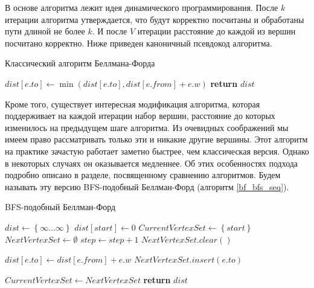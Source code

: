 В основе алгоритма лежит идея динамического программирования. После $k$ итерации алгоритма утверждается, что будут корректно посчитаны и обработаны пути длиной не более $k$. И после $V$ итерации расстояние до каждой из вершин посчитано корректно. Ниже приведен каноничный псевдокод алгоритма. 

\FloatBarrier
\begin{algorithm}
\caption{Классический алгоритм Беллмана-Форда}\label{bf_classic_seq}
\begin{algorithmic}[1]
 
		\State $dist[e.to] \gets \min(dist[e.to], dist[e.from] + e.w)$
	\EndFor
\EndFor
\State \textbf{return} $dist$
\EndProcedure
\end{algorithmic}
\end{algorithm}

\FloatBarrier
Кроме того, существует интересная модификация алгоритма, которая поддерживает на каждой итерации набор вершин, расстояние до которых изменилось на предыдущем шаге алгоритма. Из очевидных соображений мы имеем право рассматривать только эти и никакие другие вершины. Этот алгоритм на практике зачастую работает заметно быстрее, чем классическая версия. Однако в некоторых случаях он оказывается медленнее. Об этих особенностях подхода подробно описано в разделе, посвященному сравнению алгоритмов. Будем называть эту версию BFS-подобный Беллман-Форд (алгоритм \ref{bf_bfs_seq}). 

\FloatBarrier
\begin{algorithm}
\caption{BFS-подобный Беллман-Форд}\label{bf_bfs_seq}
\begin{algorithmic}[1]
\State $dist\gets \left\{ {\infty ... \infty}\right\}$
\State $dist[start] \gets 0$
\State $CurrentVertexSet \gets \left\{ {start}\right\}$ 
\State $NextVertexSet \gets \emptyset$ 
	\State $step \gets step + 1$
	\State $NextVertexSet.clear()$
	
		  
				\State $dist[e.to] \gets dist[e.from] + e.w$
				\State $NextVertexSet.insert(e.to)$								
			\EndIf
		\EndFor
	\EndFor
	
	\State $CurrentVertexSet \gets NextVertexSet$	
\EndWhile
\State \textbf{return} $dist$

\EndProcedure
\end{algorithmic}
\end{algorithm}


